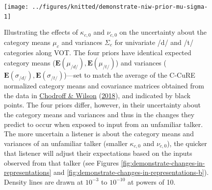 \documentclass[
  11pt,
  english,
  man,floatsintext]{apa6}
\begin{document}
\begin{figure}

{\centering \texttt{[image: ../figures/knitted/demonstrate-niw-prior-mu-sigma-1]} 

}

\caption{Illustrating the effects of \(\kappa_{c,0}\) and \(\nu_{c,0}\) on the uncertainty about the category means \(\mu_c\) and variances \(\Sigma_c\) for univariate /d/ and /t/ categories along VOT. The four priors have identical expected category means (\(\mathbf{E}(\mu_{/d/}), \mathbf{E}(\mu_{/t/})\)) and variances (\(\mathbf{E}(\sigma_{/d/}), \mathbf{E}(\sigma_{/t/})\))---set to match the average of the C-CuRE normalized category means and covariance matrices obtained from the data in \protect\hyperlink{ref-chodroff-wilson2018}{Chodroff \& Wilson} (\protect\hyperlink{ref-chodroff-wilson2018}{2018}), and indicated by black points. The four priors differ, however, in their uncertainty about the category means and variances and thus in the changes they predict to occur when exposed to input from an unfamiliar talker. The more uncertain a listener is about the category means and variances of an unfamiliar talker (smaller \(\kappa_{c,0}\) and \(\nu_{c,0}\)), the quicker that listener will adjust their expectations based on the inputs observed from that talker (see Figures \ref{fig:demonstrate-changes-in-representations} and \ref{fig:demonstrate-changes-in-representations-b}). Density lines are drawn at \(10^{-3}\) to \(10^{-10}\) at powers of 10.}\label{fig:demonstrate-niw-prior-mu-sigma}
\end{figure}
\end{document}
